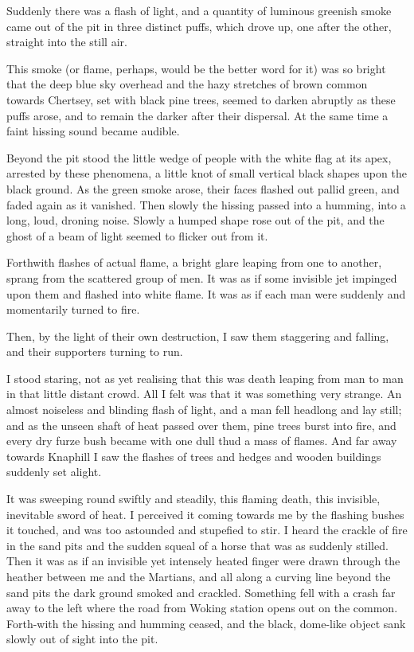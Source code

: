 Suddenly there was a flash of light, and a quantity of luminous
greenish smoke came out of the pit in three distinct puffs, which
drove up, one after the other, straight into the still air.

This smoke (or flame, perhaps, would be the better word for it) was
so bright that the deep blue sky overhead and the hazy stretches of
brown common towards Chertsey, set with black pine trees, seemed to
darken abruptly as these puffs arose, and to remain the darker
after their dispersal. At the same time a faint hissing sound
became audible.

Beyond the pit stood the little wedge of people with the white flag
at its apex, arrested by these phenomena, a little knot of small
vertical black shapes upon the black ground. As the green smoke
arose, their faces flashed out pallid green, and faded again as it
vanished. Then slowly the hissing passed into a humming, into a
long, loud, droning noise. Slowly a humped shape rose out of the
pit, and the ghost of a beam of light seemed to flicker out from
it.

Forthwith flashes of actual flame, a bright glare leaping from one
to another, sprang from the scattered group of men. It was as if
some invisible jet impinged upon them and flashed into white flame.
It was as if each man were suddenly and momentarily turned to
fire.

Then, by the light of their own destruction, I saw them staggering
and falling, and their supporters turning to run.

I stood staring, not as yet realising that this was death leaping
from man to man in that little distant crowd. All I felt was that
it was something very strange. An almost noiseless and blinding
flash of light, and a man fell headlong and lay still; and as the
unseen shaft of heat passed over them, pine trees burst into fire,
and every dry furze bush became with one dull thud a mass of
flames. And far away towards Knaphill I saw the flashes of trees
and hedges and wooden buildings suddenly set alight.

It was sweeping round swiftly and steadily, this flaming death,
this invisible, inevitable sword of heat. I perceived it coming
towards me by the flashing bushes it touched, and was too astounded
and stupefied to stir. I heard the crackle of fire in the sand pits
and the sudden squeal of a horse that was as suddenly stilled. Then
it was as if an invisible yet intensely heated finger were drawn
through the heather between me and the Martians, and all along a
curving line beyond the sand pits the dark ground smoked and
crackled. Something fell with a crash far away to the left where
the road from Woking station opens out on the common. Forth-with
the hissing and humming ceased, and the black, dome-like object
sank slowly out of sight into the pit.

